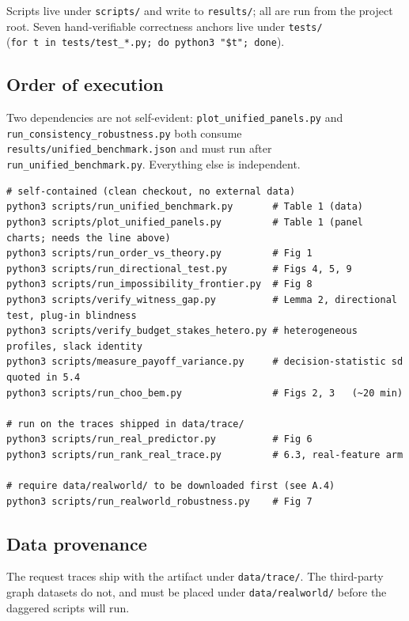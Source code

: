 
Scripts live under \texttt{scripts/} and write to \texttt{results/}; all
are run from the project root. Seven hand-verifiable correctness anchors
live under \texttt{tests/}
(\texttt{for\ t\ in\ tests/test\_*.py;\ do\ python3\ "\$t";\ done}).

\subsection{Order of execution}

Two dependencies are not self-evident: \texttt{plot\_unified\_panels.py}
and \texttt{run\_consistency\_robustness.py} both consume
\texttt{results/unified\_benchmark.json} and must run after
\texttt{run\_unified\_benchmark.py}. Everything else is independent.

\begin{verbatim}
# self-contained (clean checkout, no external data)
python3 scripts/run_unified_benchmark.py       # Table 1 (data)
python3 scripts/plot_unified_panels.py         # Table 1 (panel charts; needs the line above)
python3 scripts/run_order_vs_theory.py         # Fig 1
python3 scripts/run_directional_test.py        # Figs 4, 5, 9
python3 scripts/run_impossibility_frontier.py  # Fig 8
python3 scripts/verify_witness_gap.py          # Lemma 2, directional test, plug-in blindness
python3 scripts/verify_budget_stakes_hetero.py # heterogeneous profiles, slack identity
python3 scripts/measure_payoff_variance.py     # decision-statistic sd quoted in 5.4
python3 scripts/run_choo_bem.py                # Figs 2, 3   (~20 min)

# run on the traces shipped in data/trace/
python3 scripts/run_real_predictor.py          # Fig 6
python3 scripts/run_rank_real_trace.py         # 6.3, real-feature arm

# require data/realworld/ to be downloaded first (see A.4)
python3 scripts/run_realworld_robustness.py    # Fig 7
\end{verbatim}

\subsection{Data provenance}

The request traces ship with the artifact under \texttt{data/trace/}.
The third-party graph datasets do not, and must be placed under
\texttt{data/realworld/} before the daggered scripts will run.

